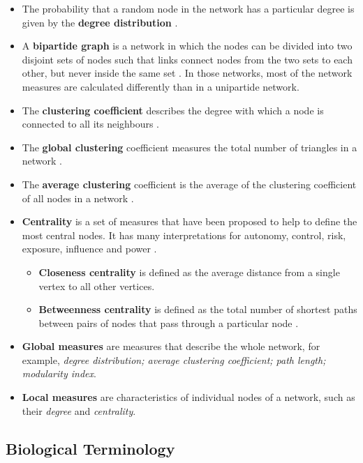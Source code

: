 \documentclass[
]{book}
\begin{document}
\begin{itemize}
\item
  The probability that a random node in the network has a particular degree is given by the \textbf{degree distribution} \citep{barabasi2004network}.
\item
  A \textbf{bipartide graph} is a network in which the nodes can be divided into two disjoint sets of nodes such that links connect nodes from the two sets to each other, but never inside the same set \citep{Barabasi2016}. In those networks, most of the network measures are calculated differently than in a unipartide network.
\item
  The \textbf{clustering coefficient} describes the degree with which a node is connected to all its neighbours \citep{barabasi2004network}.
\item
  The \textbf{global clustering} coefficient measures the total number of triangles in a network \citep{Barabasi2016}.
\item
  The \textbf{average clustering} coefficient is the average of the clustering coefficient of all nodes in a network \citep{barabasi2004network}.
\item
  \textbf{Centrality} is a set of measures that have been proposed to help to define the most central nodes. It has many interpretations for autonomy, control, risk, exposure, influence and power \citep{Borgatti2006ACentrality}.

  \begin{itemize}
  \item
    \textbf{Closeness centrality} is defined as the average distance from a single vertex to all other vertices\citep{Newman2018}.
  \item
    \textbf{Betweenness centrality} is defined as the total number of shortest paths between pairs of nodes that pass through a particular node \citep{Newman2018}.
  \end{itemize}
\item
  \textbf{Global measures} are measures that describe the whole network, for example, \emph{degree distribution; average clustering coefficient; path length; modularity index}.
\item
  \textbf{Local measures} are characteristics of individual nodes of a network, such as their \emph{degree} and \emph{centrality}.
\end{itemize}

\hypertarget{biological-terminology}{%
\subsection{Biological Terminology}\label{biological-terminology}}
\end{document}

